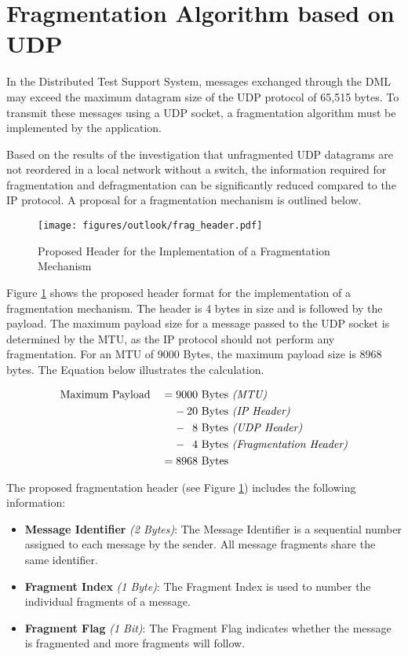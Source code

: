 \chapter*{Fragmentation Algorithm based on UDP} \label{chap:fragProposalOutlook}
In the Distributed Test Support System, messages exchanged through the DML may exceed the maximum datagram size of the UDP protocol of 65,515 bytes. To transmit these messages using a UDP socket, a fragmentation algorithm must be implemented by the application.

Based on the results of the investigation that unfragmented UDP datagrams are not reordered in a local network without a switch, the information required for fragmentation and defragmentation can be significantly reduced compared to the IP protocol. A proposal for a fragmentation mechanism is outlined below.

\begin{figure}[h!]
    \centering
    \texttt{[image: figures/outlook/frag\_header.pdf]}
    \caption{Proposed Header for the Implementation of a Fragmentation Mechanism}
    \label{fig:FragProposal}
\end{figure}

Figure \ref{fig:FragProposal} shows the proposed header format for the implementation of a fragmentation mechanism. The header is 4 bytes in size and is followed by the payload. The maximum payload size for a message passed to the UDP socket is determined by the MTU, as the IP protocol should not perform any fragmentation. For an MTU of 9000 Bytes, the maximum payload size is 8968 bytes. The Equation below illustrates the calculation.

\begin{alignat}{2}
&\text{Maximum Payload} &&= 9000\ \text{Bytes \textit{(MTU)}} \\
&&&\phantom{=}\ - 20\ \text{Bytes \textit{(IP Header)}} \notag \\
&&&\phantom{=}\ - \phantom{0}8\ \text{Bytes \textit{(UDP Header)}} \notag \\
&&&\phantom{=}\ - \phantom{0}4\ \text{Bytes \textit{(Fragmentation Header)}} \notag \\
&&&= 8968\ \text{Bytes} \notag
\end{alignat}

The proposed fragmentation header (see Figure \ref{fig:FragProposal}) includes the following information:

\begin{itemize}
  \item \textbf{Message Identifier} \textit{(2 Bytes)}: The Message Identifier is a sequential number assigned to each message by the sender. All message fragments share the same identifier.
  \item \textbf{Fragment Index} \textit{(1 Byte)}: The Fragment Index is used to number the individual fragments of a message.
  \item \textbf{Fragment Flag} \textit{(1 Bit)}: The Fragment Flag indicates whether the message is fragmented and more fragments will follow.
\end{itemize}

